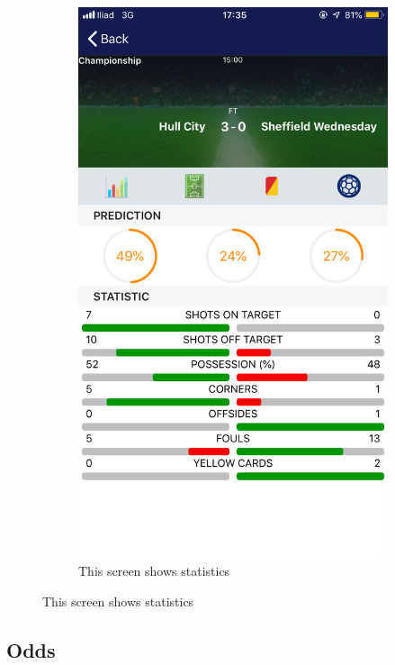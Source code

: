 \documentclass[numbers=noenddot, 12pt, a4paper, oneside]{scrbook}
\begin{document}
\begin{figure}[H]
	\centering
	\begin{subfigure}{.5\textwidth}
		\centering
		\includegraphics[width=.8\linewidth]{images/Screen/Statistica}
		\caption{This screen shows statistics}
	\end{subfigure}
\end{figure}

\subsection*{Odds}
\end{document}
